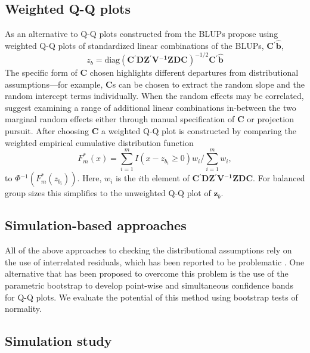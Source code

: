 \documentclass[11pt]{article} %
\newcommand{\inv}{\ensuremath{^{-1}}}
\newcommand{\trans}{\ensuremath{^\prime}}
\begin{document}
\subsection{Weighted Q-Q plots}

As an alternative to Q-Q plots constructed from the BLUPs \cite{Lange:1989uu} propose using weighted Q-Q plots of standardized linear combinations of the BLUPs, $\bm{C\trans}\widehat{\bm{b}}$,
%
\begin{equation}
z_{b} = \text{diag} \left(\bm{C\trans DZ\trans V\inv ZDC}\right)^{-1/2} \bm{C\trans}\widehat{\bm{b}}
\end{equation}
%
The specific form of $\bm{C}$ chosen highlights different departures from distributional assumptions---for example, $\bm{C}$s can be chosen to extract the random slope and the random intercept terms individually. When the random effects may be correlated, \citeauthor{Lange:1989uu} suggest examining a range of additional linear combinations in-between the two marginal random effects either through manual specification of $\bm{C}$ or projection pursuit.
After choosing $\bm{C}$ a weighted Q-Q plot is constructed by comparing the weighted empirical cumulative distribution function
%
\begin{equation}
F_m^*(x) = \sum_{i=1}^{m} I(x - z_{b_i} \geq 0) w_i \bigg/ \sum_{i=1}^{m} w_i, 
\end{equation}
%
to $\Phi\inv \left ( F_m^*(z_{b_i}) \right)$. Here, $w_i$ is the $i$th element of $\bm{C\trans DZ\trans V\inv ZDC}$.
For balanced group sizes this simplifies to the unweighted Q-Q plot of $\bm{z}_b$.
%

\subsection{Simulation-based approaches}

All of the above approaches to checking the distributional assumptions rely on the use of interrelated residuals, which has been reported to be problematic \citep{HildenMinton:1995wh, Verbeke:1996va}.  
One alternative that has been proposed to overcome this problem is the use of the parametric bootstrap to develop point-wise and simultaneous confidence bands for Q-Q plots. We evaluate the potential of this method using bootstrap tests of normality.


\subsection{Simulation study}\label{supp:simstudy1}
\end{document}
